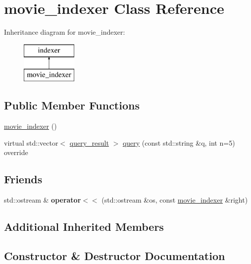 \hypertarget{classmovie__indexer}{}\section{movie\+\_\+indexer Class Reference}
\label{classmovie__indexer}
Inheritance diagram for movie\+\_\+indexer\+:\begin{figure}[H]
\begin{center}
\leavevmode
\includegraphics[height=2.000000cm]{classmovie__indexer}
\end{center}
\end{figure}
\subsection*{Public Member Functions}
\begin{DoxyCompactItemize}
\item 
\hyperlink{classmovie__indexer_a24fcbe6f81f28e9007202cd96df5e191}{movie\+\_\+indexer} ()
\item 
virtual std\+::vector$<$ \hyperlink{classquery__result}{query\+\_\+result} $>$ \hyperlink{classmovie__indexer_ac41cf13705a275a39a0fae8d6e9fd9d5}{query} (const std\+::string \&q, int n=5) override
\end{DoxyCompactItemize}
\subsection*{Friends}
\begin{DoxyCompactItemize}
\item 
\mbox{\label{classmovie__indexer_a4b9f161e34b327a709669612fad91899}} 
std\+::ostream \& {\bfseries operator$<$$<$} (std\+::ostream \&os, const \hyperlink{classmovie__indexer}{movie\+\_\+indexer} \&right)
\end{DoxyCompactItemize}
\subsection*{Additional Inherited Members}


\subsection{Constructor \& Destructor Documentation}
\mbox{\label{classmovie__indexer_a24fcbe6f81f28e9007202cd96df5e191}} 
